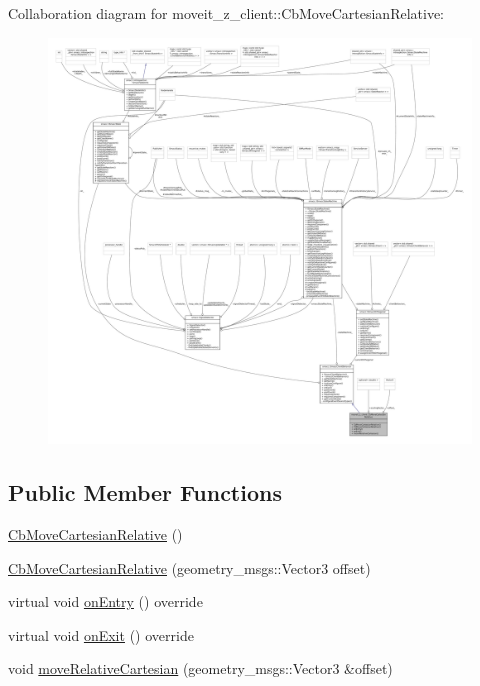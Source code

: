 Collaboration diagram for moveit\+\_\+z\+\_\+client\+:\+:Cb\+Move\+Cartesian\+Relative\+:
\nopagebreak
\begin{figure}[H]
\begin{center}
\leavevmode
\includegraphics[width=350pt]{classmoveit__z__client_1_1CbMoveCartesianRelative__coll__graph}
\end{center}
\end{figure}
\subsection*{Public Member Functions}
\begin{DoxyCompactItemize}
\item 
\hyperlink{classmoveit__z__client_1_1CbMoveCartesianRelative_a5c8cc24c13c1b440cd3ee7cdb26ec7e2}{Cb\+Move\+Cartesian\+Relative} ()
\item 
\hyperlink{classmoveit__z__client_1_1CbMoveCartesianRelative_a07c04dffa04c5cd30d46109ed2167932}{Cb\+Move\+Cartesian\+Relative} (geometry\+\_\+msgs\+::\+Vector3 offset)
\item 
virtual void \hyperlink{classmoveit__z__client_1_1CbMoveCartesianRelative_aaea0e6c7431f93301a77269b8fa539f8}{on\+Entry} () override
\item 
virtual void \hyperlink{classmoveit__z__client_1_1CbMoveCartesianRelative_a539af37d16cffdc51127c7a5206504cb}{on\+Exit} () override
\item 
void \hyperlink{classmoveit__z__client_1_1CbMoveCartesianRelative_aeffc7467b010f64ace4c7e7f699e6055}{move\+Relative\+Cartesian} (geometry\+\_\+msgs\+::\+Vector3 \&offset)
\end{DoxyCompactItemize}
